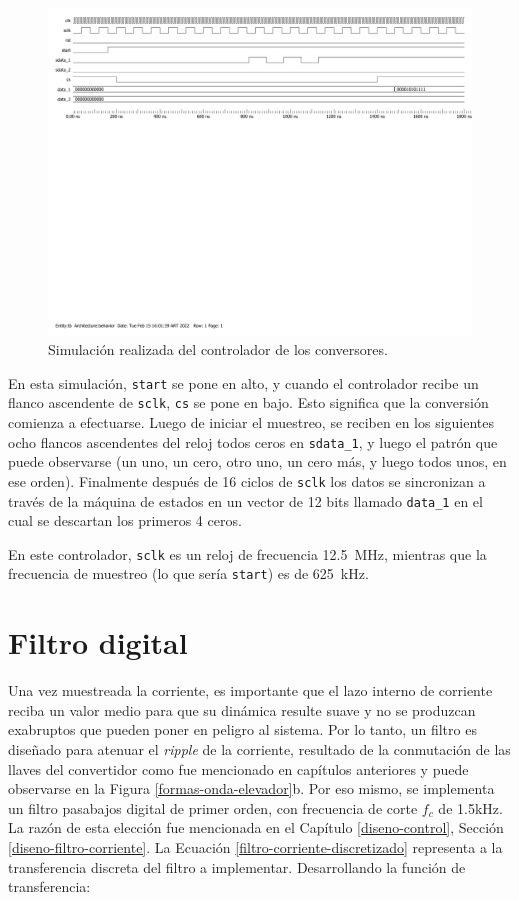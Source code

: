 \begin{figure}[hbt!]
    \centering
    \includegraphics[width=0.85\columnwidth]{Imágenes/Conversor analógico-digital/Test bench.pdf}
    \caption{Simulación realizada del controlador de los conversores.}
    \label{adc-controller}
\end{figure} 

En esta simulación, \texttt{start} se pone en alto, y cuando el controlador recibe un flanco ascendente de \texttt{sclk}, \texttt{cs} se pone en bajo. Esto significa que la conversión comienza a efectuarse. Luego de iniciar el muestreo, se reciben en los siguientes ocho flancos ascendentes del reloj todos ceros en \texttt{sdata\_1}, y luego el patrón que puede observarse (un uno, un cero, otro uno, un cero más, y luego todos unos, en ese orden). Finalmente después de 16 ciclos de \texttt{sclk} los datos se sincronizan a través de la máquina de estados en un vector de 12 bits llamado \texttt{data\_1} en el cual se descartan los primeros 4 ceros.

En este controlador, \texttt{sclk} es un reloj de frecuencia \SI{12.5}{\mega\hertz}, mientras que la frecuencia de muestreo (lo que sería \texttt{start}) es de \SI{625}{\kilo\hertz}. 

\section{Filtro digital}

Una vez muestreada la corriente, es importante que el lazo interno de corriente reciba un valor medio para que su dinámica resulte suave y no se produzcan exabruptos que pueden poner en peligro al sistema. Por lo tanto, un filtro es diseñado para atenuar el \emph{ripple} de la corriente, resultado de la conmutación de las llaves del convertidor como fue mencionado en capítulos anteriores y puede observarse en la Figura \ref{formas-onda-elevador}b. Por eso mismo, se implementa un filtro pasabajos digital de primer orden, con frecuencia de corte $f_c$ de 1.5kHz. La razón de esta elección fue mencionada en el Capítulo \ref{diseno-control}, Sección \ref{diseno-filtro-corriente}. La Ecuación \ref{filtro-corriente-discretizado} representa a la transferencia discreta del filtro a implementar. Desarrollando la función de transferencia:

